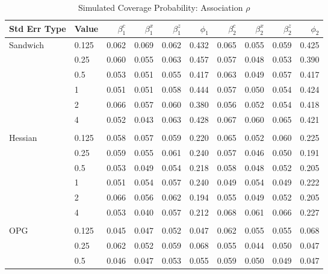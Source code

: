 \documentclass[12pt]{article}
\theoremstyle{definition}
\begin{document}
\begin{table}[b!] \centering
  \caption{Simulated Coverage Probability: Association $\rho$}
  \begin{threeparttable}
    {\footnotesize
    \begin{tabular}[r]{l l r r r r r r r r}
  \hline
Std Err Type & Value & $\beta_{1}^{c}$ & $\beta_{1}^{x}$ & $\beta_{1}^{z}$ & $\phi_{1}$ & $\beta_{2}^{c}$ & $\beta_{2}^{x}$ & $\beta_{2}^{z}$ & $\phi_{2}$ \\ 
  \hline

Sandwich  & 0.125 & 0.062 & 0.069 & 0.062 & 0.432 & 0.065 & 0.055 & 0.059 & 0.425 \\
          &  0.25 & 0.060 & 0.055 & 0.063 & 0.457 & 0.057 & 0.048 & 0.053 & 0.390 \\
          &   0.5 & 0.053 & 0.051 & 0.055 & 0.417 & 0.063 & 0.049 & 0.057 & 0.417 \\
          &     1 & 0.051 & 0.051 & 0.058 & 0.444 & 0.057 & 0.050 & 0.054 & 0.424 \\
          &     2 & 0.066 & 0.057 & 0.060 & 0.380 & 0.056 & 0.052 & 0.054 & 0.418 \\
          &     4 & 0.052 & 0.043 & 0.063 & 0.428 & 0.067 & 0.060 & 0.065 & 0.421 \\
          &       &       &       &       &       &       &       &       &       \\
Hessian   & 0.125 & 0.058 & 0.057 & 0.059 & 0.220 & 0.065 & 0.052 & 0.060 & 0.225 \\
          &  0.25 & 0.059 & 0.055 & 0.061 & 0.240 & 0.057 & 0.046 & 0.050 & 0.191 \\
          &   0.5 & 0.053 & 0.049 & 0.054 & 0.218 & 0.058 & 0.048 & 0.052 & 0.205 \\
          &     1 & 0.051 & 0.054 & 0.057 & 0.240 & 0.049 & 0.054 & 0.049 & 0.222 \\
          &     2 & 0.066 & 0.056 & 0.062 & 0.194 & 0.055 & 0.049 & 0.052 & 0.205 \\
          &     4 & 0.053 & 0.040 & 0.057 & 0.212 & 0.068 & 0.061 & 0.066 & 0.227 \\
          &       &       &       &       &       &       &       &       &       \\
OPG       & 0.125 & 0.045 & 0.047 & 0.052 & 0.047 & 0.062 & 0.055 & 0.055 & 0.068 \\
          &  0.25 & 0.062 & 0.052 & 0.059 & 0.068 & 0.055 & 0.044 & 0.050 & 0.047 \\
          &   0.5 & 0.046 & 0.047 & 0.053 & 0.055 & 0.059 & 0.050 & 0.049 & 0.047 \\

\end{tabular}}
\end{threeparttable}
\end{table}
\end{document}
